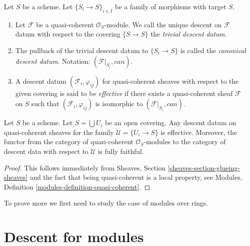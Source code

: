 \begin{definition}
\label{definition-descent-datum-effective-quasi-coherent}
Let $S$ be a scheme.
Let $\{S_i \to S\}_{i \in I}$ be a family of morphisms
with target $S$.
\begin{enumerate}
\item Let $\mathcal{F}$ be a quasi-coherent $\mathcal{O}_S$-module.
We call the unique descent on $\mathcal{F}$ datum with respect to the covering
$\{S \to S\}$ the {\it trivial descent datum}.
\item The pullback of the trivial descent datum to
$\{S_i \to S\}$ is called the {\it canonical descent datum}.
Notation: $(\mathcal{F}|_{S_i}, can)$.
\item A descent datum $(\mathcal{F}_i, \varphi_{ij})$
for quasi-coherent sheaves with respect to the given covering
is said to be {\it effective} if there exists a quasi-coherent
sheaf $\mathcal{F}$ on $S$ such that $(\mathcal{F}_i, \varphi_{ij})$
is isomorphic to $(\mathcal{F}|_{S_i}, can)$.
\end{enumerate}
\end{definition}

\begin{lemma}
\label{lemma-zariski-descent-effective}
Let $S$ be a scheme.
Let $S = \bigcup U_i$ be an open covering.
Any descent datum on quasi-coherent sheaves
for the family $\mathcal{U} = \{U_i \to S\}$ is
effective. Moreover, the functor from the category of
quasi-coherent $\mathcal{O}_S$-modules to the category
of descent data with respect to $\mathcal{U}$ is fully faithful.
\end{lemma}

\begin{proof}
This follows immediately from
Sheaves, Section \ref{sheaves-section-glueing-sheaves}
and the fact that being quasi-coherent is a local property, see
Modules, Definition \ref{modules-definition-quasi-coherent}.
\end{proof}

\noindent
To prove more we first need to study the case of modules over rings.










\section{Descent for modules}
\label{section-descent-modules}

